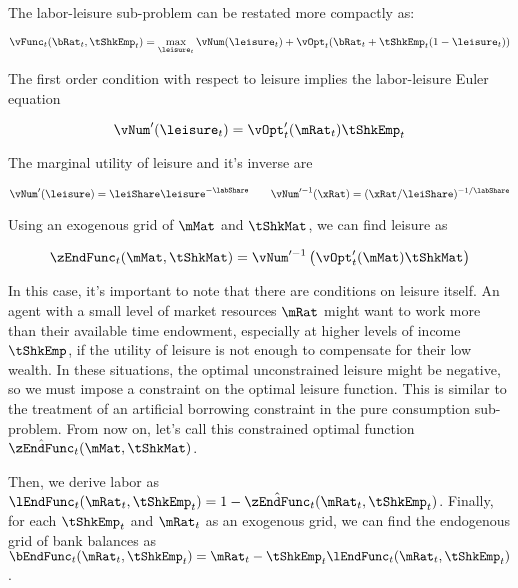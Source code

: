 \documentclass[\econtexRoot/SequentialEGM]{subfiles}
\begin{document}
The labor-leisure sub-problem can  be restated more compactly as:

\begin{equation}
        \vFunc_{t}(\bRat_{t}, \tShkEmp_{t}) = \max_{ \leisure_{t}}
        \vNum(\leisure_{t}) + \vOpt_{t}(\bRat_{t} +
        \tShkEmp_{t}(1-\leisure_{t}))
\end{equation}

The first order condition with respect to leisure implies the labor-leisure Euler equation

\begin{equation}
        \vNum'(\leisure_{t}) =	\vOpt_{t}'(\mRat_{t}) \tShkEmp_{t}
\end{equation}

The marginal utility of leisure and it's inverse are

\begin{equation}
        \vNum'(\leisure) = \leiShare\leisure^{-\labShare} \qquad
        \vNum'^{-1}(\xRat) = (\xRat/\leiShare)^{-1/\labShare}
\end{equation}

Using an exogenous grid of $\mMat$ and $\tShkMat$, we can find leisure as

\begin{equation}
        \zEndFunc_{t}(\mMat, \tShkMat) = \vNum'^{-1}\left(
        \vOpt_{t}'(\mMat) \tShkMat \right)
\end{equation}

In this case, it's important to note that there are conditions on leisure itself. An agent with a small level of market resources $\mRat$ might want to work more than their available time endowment, especially at higher levels of income $\tShkEmp$, if the utility of leisure is not enough to compensate for their low wealth. In these situations, the optimal unconstrained leisure might be negative, so we must impose a constraint on the optimal leisure function. This is similar to the treatment of an artificial borrowing constraint in the pure consumption sub-problem. From now on, let's call this constrained optimal function $\hat{\zEndFunc}_{t}(\mMat, \tShkMat)$.

Then, we derive labor as $\lEndFunc_{t}(\mRat_{t}, \tShkEmp_{t}) = 1 -
        \hat{\zEndFunc}_{t}(\mRat_{t}, \tShkEmp_{t})$. Finally, for each
$\tShkEmp_{t}$ and
$\mRat_{t}$ as an exogenous grid, we can find the endogenous grid of bank
balances as $\bEndFunc_{t}(\mRat_{t}, \tShkEmp_{t}) = \mRat_{t} -
        \tShkEmp_{t}\lEndFunc_{t}(\mRat_{t}, \tShkEmp_{t})$.
\end{document}

